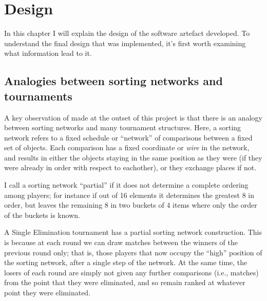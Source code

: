 \documentclass[a4,11pt,twoside,final,hidelinks]{article}
\begin{document}
\newpage

\section{\label{design} Design}
\label{sec:orgfc3ec97}

In this chapter I will explain the design of the software artefact developed. To
understand the final design that was implemented, it's first worth examining
what information lead to it.

\subsection{Analogies between sorting networks and tournaments}
\label{sec:org3a34125}

A key observation of made at the outset of this project is that there is an
analogy between sorting networks and many tournament structures. Here, a sorting
network refers to a fixed schedule or ``network'' of comparisons between a fixed
set of objects. Each comparison has a fixed coordinate or \emph{wire} in the network,
and results in either the objects staying in the same position as they were (if
they were already in order with respect to eachother), or they exchange places
if not.

I call a sorting network ``partial'' if it does not determine a complete ordering
among players; for instance if out of 16 elements it determines the greatest 8
in order, but leaves the remaining 8 in two buckets of 4 items where only the
order of the buckets is known.

\begin{figure}[H]
\hfill
{}
\hfill
{}
\hfill
\end{figure}

A Single Elimination tournament has a partial sorting network construction. This
is because at each round we can draw matches between the winners of the previous
round only; that is, those players that now occupy the ``high'' position of the
sorting network, after a single step of the network. At the same time, the
losers of each round are simply not given any further comparisons (i.e.,
matches) from the point that they were eliminated, and so remain ranked at
whatever point they were eliminated.
\end{document}
